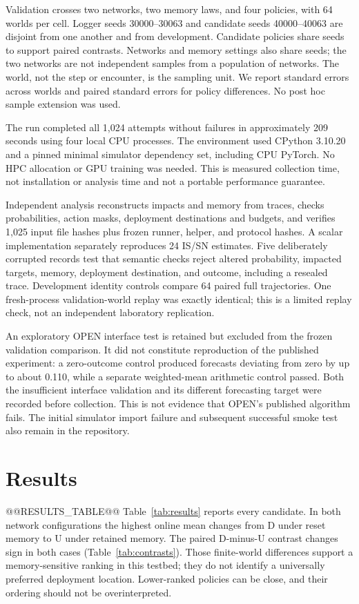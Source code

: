 \documentclass[sigconf,nonacm]{acmart}
\begin{document}
Validation crosses two networks, two memory laws, and four policies, with 64 worlds per cell. Logger seeds 30000--30063 and candidate seeds 40000--40063 are disjoint from one another and from development. Candidate policies share seeds to support paired contrasts. Networks and memory settings also share seeds; the two networks are not independent samples from a population of networks. The world, not the step or encounter, is the sampling unit. We report standard errors across worlds and paired standard errors for policy differences. No post hoc sample extension was used.

The run completed all 1,024 attempts without failures in approximately 209 seconds using four local CPU processes. The environment used CPython 3.10.20 and a pinned minimal simulator dependency set, including CPU PyTorch. No HPC allocation or GPU training was needed. This is measured collection time, not installation or analysis time and not a portable performance guarantee.

Independent analysis reconstructs impacts and memory from traces, checks probabilities, action masks, deployment destinations and budgets, and verifies 1,025 input file hashes plus frozen runner, helper, and protocol hashes. A scalar implementation separately reproduces 24 IS/SN estimates. Five deliberately corrupted records test that semantic checks reject altered probability, impacted targets, memory, deployment destination, and outcome, including a resealed trace. Development identity controls compare 64 paired full trajectories. One fresh-process validation-world replay was exactly identical; this is a limited replay check, not an independent laboratory replication.

An exploratory OPEN interface test is retained but excluded from the frozen validation comparison. It did not constitute reproduction of the published experiment: a zero-outcome control produced forecasts deviating from zero by up to about 0.110, while a separate weighted-mean arithmetic control passed. Both the insufficient interface validation and its different forecasting target were recorded before collection. This is not evidence that OPEN's published algorithm fails. The initial simulator import failure and subsequent successful smoke test also remain in the repository.

\section{Results}
@@RESULTS_TABLE@@
Table~\ref{tab:results} reports every candidate. In both network configurations the highest online mean changes from D under reset memory to U under retained memory. The paired D-minus-U contrast changes sign in both cases (Table~\ref{tab:contrasts}). Those finite-world differences support a memory-sensitive ranking in this testbed; they do not identify a universally preferred deployment location. Lower-ranked policies can be close, and their ordering should not be overinterpreted.
\end{document}
